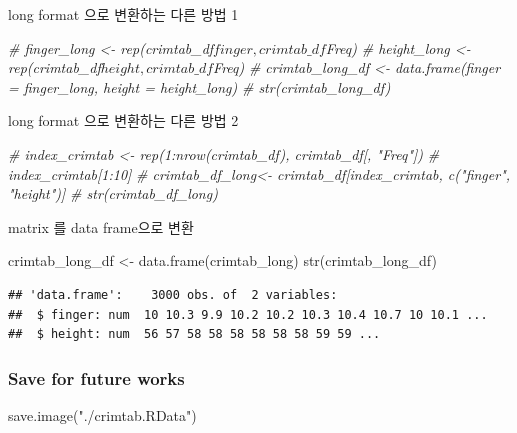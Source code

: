 \documentclass[
]{article}
\newenvironment{Shaded}{\begin{snugshade}}{\end{snugshade}}
\newcommand{\CommentTok}[1]{\textcolor[rgb]{0.56,0.35,0.01}{\textit{#1}}}
\newcommand{\FunctionTok}[1]{\textcolor[rgb]{0.00,0.00,0.00}{#1}}
\newcommand{\NormalTok}[1]{#1}
\newcommand{\OtherTok}[1]{\textcolor[rgb]{0.56,0.35,0.01}{#1}}
\newcommand{\StringTok}[1]{\textcolor[rgb]{0.31,0.60,0.02}{#1}}
\begin{document}
long format 으로 변환하는 다른 방법 1

\begin{Shaded}
\begin{Highlighting}[]
\CommentTok{\# finger\_long \textless{}{-} rep(crimtab\_df$finger, crimtab\_df$Freq)}
\CommentTok{\# height\_long \textless{}{-} rep(crimtab\_df$height, crimtab\_df$Freq)}
\CommentTok{\# crimtab\_long\_df \textless{}{-} data.frame(finger = finger\_long, height = height\_long)}
\CommentTok{\# str(crimtab\_long\_df)}
\end{Highlighting}
\end{Shaded}

long format 으로 변환하는 다른 방법 2

\begin{Shaded}
\begin{Highlighting}[]
\CommentTok{\# index\_crimtab \textless{}{-} rep(1:nrow(crimtab\_df), crimtab\_df[, "Freq"])}
\CommentTok{\# index\_crimtab[1:10]}
\CommentTok{\# crimtab\_df\_long\textless{}{-} crimtab\_df[index\_crimtab, c("finger", "height")]}
\CommentTok{\# str(crimtab\_df\_long)}
\end{Highlighting}
\end{Shaded}

matrix 를 data frame으로 변환

\begin{Shaded}
\begin{Highlighting}[]
\NormalTok{crimtab\_long\_df }\OtherTok{\textless{}{-}} \FunctionTok{data.frame}\NormalTok{(crimtab\_long)}
\FunctionTok{str}\NormalTok{(crimtab\_long\_df)}
\end{Highlighting}
\end{Shaded}

\begin{verbatim}
## 'data.frame':    3000 obs. of  2 variables:
##  $ finger: num  10 10.3 9.9 10.2 10.2 10.3 10.4 10.7 10 10.1 ...
##  $ height: num  56 57 58 58 58 58 58 58 59 59 ...
\end{verbatim}

\hypertarget{save-for-future-works}{%
\subsubsection{Save for future works}\label{save-for-future-works}}

\begin{Shaded}
\begin{Highlighting}[]
\FunctionTok{save.image}\NormalTok{(}\StringTok{"./crimtab.RData"}\NormalTok{)}
\end{Highlighting}
\end{Shaded}
\end{document}
